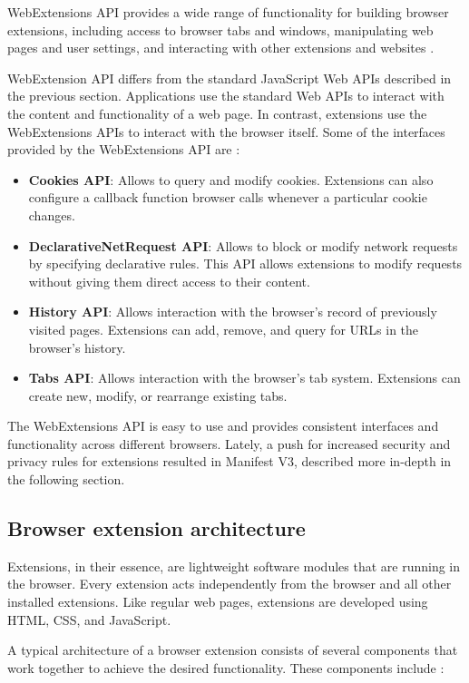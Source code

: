 WebExtensions API provides a wide range of functionality for building browser extensions, including access to browser tabs and windows, manipulating web pages and user settings, and interacting with other extensions and websites \cite{ChromeWebExtensions}.

WebExtension API differs from the standard JavaScript Web APIs described in the previous section. Applications use the standard Web APIs to interact with the content and functionality of a web page. In contrast, extensions use the WebExtensions APIs to interact with the browser itself. Some of the interfaces provided by the WebExtensions API are \cite{ChromeWebExtensions}:

\begin{itemize}
	\item \textbf{Cookies API}: Allows to query and modify cookies. Extensions can also configure a callback function browser calls whenever a particular cookie changes.
	\item \textbf{DeclarativeNetRequest API}: Allows to block or modify network requests by specifying declarative rules. This API allows extensions to modify requests without giving them direct access to their content.
	\item \textbf{History API}: Allows interaction with the browser's record of previously visited pages. Extensions can add, remove, and query for URLs in the browser's history.
	\item \textbf{Tabs API}: Allows interaction with the browser's tab system. Extensions can create new, modify, or rearrange existing tabs.
\end{itemize}

The WebExtensions API is easy to use and provides consistent interfaces and functionality across different browsers. Lately, a push for increased security and privacy rules for extensions resulted in Manifest V3, described more in-depth in the following section.

\subsection{Browser extension architecture}

Extensions, in their essence, are lightweight software modules that are running in the browser. Every extension acts independently from the browser and all other installed extensions. Like regular web pages, extensions are developed using HTML, CSS, and JavaScript.

A typical architecture of a browser extension consists of several components that work together to achieve the desired functionality. These components include \cite{ChromeWebExtensions}:


